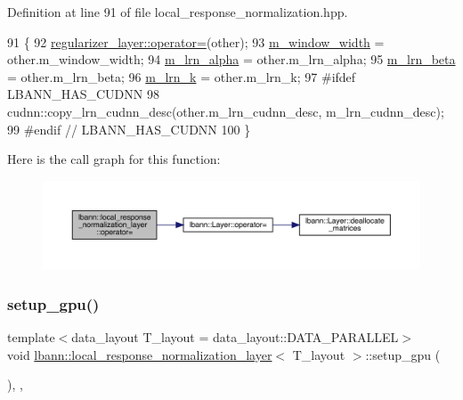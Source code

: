 Definition at line 91 of file local\+\_\+response\+\_\+normalization.\+hpp.


\begin{DoxyCode}
91                                                                                                  \{
92     \hyperlink{classlbann_1_1Layer_a00d8acde68fda2f38c4a39ef8c89234a}{regularizer\_layer::operator=}(other);
93     \hyperlink{classlbann_1_1local__response__normalization__layer_a4914619a19eb43efcf8240b8a1e0c090}{m\_window\_width} = other.m\_window\_width;
94     \hyperlink{classlbann_1_1local__response__normalization__layer_a85c25a68888e2e9d163a820326fc09ff}{m\_lrn\_alpha} = other.m\_lrn\_alpha;
95     \hyperlink{classlbann_1_1local__response__normalization__layer_ad06848e9d59664be86aecbc1e2ba556f}{m\_lrn\_beta} = other.m\_lrn\_beta;
96     \hyperlink{classlbann_1_1local__response__normalization__layer_a896f875d6f6a763c1cb0dbd43679164e}{m\_lrn\_k} = other.m\_lrn\_k;
97 \textcolor{preprocessor}{  #ifdef LBANN\_HAS\_CUDNN}
98     cudnn::copy\_lrn\_cudnn\_desc(other.m\_lrn\_cudnn\_desc, m\_lrn\_cudnn\_desc);
99 \textcolor{preprocessor}{  #endif // LBANN\_HAS\_CUDNN}
100   \}
\end{DoxyCode}
Here is the call graph for this function\+:\nopagebreak
\begin{figure}[H]
\begin{center}
\leavevmode
\includegraphics[width=350pt]{classlbann_1_1local__response__normalization__layer_a7a1e5eb532bbf72c6334ac865d0694a3_cgraph}
\end{center}
\end{figure}
\mbox{\label{classlbann_1_1local__response__normalization__layer_aff5210d74db5f8302989cca12d04263d}} 
\subsubsection{\texorpdfstring{setup\+\_\+gpu()}{setup\_gpu()}}
{\footnotesize\ttfamily template$<$data\+\_\+layout T\+\_\+layout = data\+\_\+layout\+::\+D\+A\+T\+A\+\_\+\+P\+A\+R\+A\+L\+L\+EL$>$ \\
void \hyperlink{classlbann_1_1local__response__normalization__layer}{lbann\+::local\+\_\+response\+\_\+normalization\+\_\+layer}$<$ T\+\_\+layout $>$\+::setup\+\_\+gpu (\begin{DoxyParamCaption}{ }\end{DoxyParamCaption})\hspace{0.3cm}{\ttfamily [inline]}, {\ttfamily [override]}, {\ttfamily [virtual]}}



